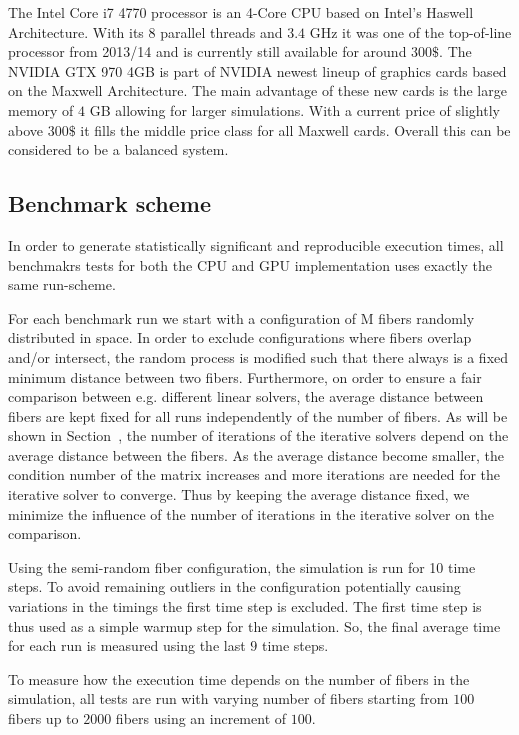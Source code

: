 The Intel Core i7 4770 processor is an 4-Core CPU based on Intel's Haswell Architecture. With its 8 parallel threads and $3.4$ GHz it was one of the top-of-line processor from 2013/14 and is currently still available for around $300\$$. The NVIDIA GTX 970 4GB is part of NVIDIA newest lineup of graphics cards based on the Maxwell Architecture. The main advantage of these new cards is the large memory of $4$ GB allowing for larger simulations. With a current price of slightly above $300\$$ it fills the middle price class for all Maxwell cards. Overall this can be considered to be a balanced system.

\subsection{Benchmark scheme}

In order to generate statistically significant and reproducible execution times, all benchmakrs tests for both the CPU and GPU implementation uses exactly the same run-scheme.

For each benchmark run we start with a configuration of M fibers randomly distributed in space. In order to exclude configurations where fibers overlap and/or intersect, the random process is modified such that there always is a fixed minimum distance between two fibers. Furthermore, on order to ensure a fair comparison between e.g. different linear solvers, the average distance between fibers are kept fixed for all runs independently of the number of fibers. As will be shown in Section~, the number of iterations of the iterative solvers depend on the average distance between the fibers. As the average distance become smaller, the condition number of the matrix increases and more iterations are needed for the iterative solver to converge. Thus by keeping the average distance fixed, we minimize the influence of the number of iterations in the iterative solver on the comparison.

Using the semi-random fiber configuration, the simulation is run for 10 time steps. To avoid remaining outliers in the configuration potentially causing variations in the timings the first time step is excluded. The first time step is thus used as a simple warmup step for the simulation. So, the final average time for each run is measured using the last $9$ time steps.

To measure how the execution time depends on the number of fibers in the simulation, all tests are run with varying number of fibers starting from $100$ fibers up to $2000$ fibers using an increment of $100$.

